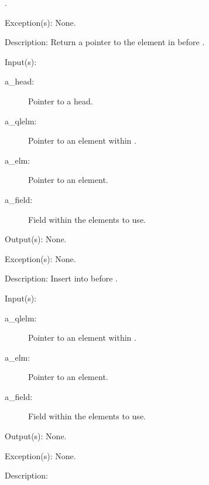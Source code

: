 \begin{capi}
\begin{capilist}
\begin{description}
\begin{description}
				.
			\end{description}
		\end{description}
	\item[Exception(s): ] None.
	\item[Description: ]
		Return a pointer to the element in  before
		.
	\end{capilist}
\label{ql_before_insert}
	\begin{capilist}
	\item[Input(s): ]
		\begin{description}\item[]
		\item[a\_head: ]
			Pointer to a  head.
		\item[a\_qlelm: ]
			Pointer to an element within .
		\item[a\_elm: ]
			Pointer to an element.
		\item[a\_field: ]
			Field within the  elements to use.
		\end{description}
	\item[Output(s): ] None.
	\item[Exception(s): ] None.
	\item[Description: ]
		Insert  into  before .
	\end{capilist}
\label{ql_after_insert}
	\begin{capilist}
	\item[Input(s): ]
		\begin{description}\item[]
		\item[a\_qlelm: ]
			Pointer to an element within \cvar{a\_head}.
		\item[a\_elm: ]
			Pointer to an element.
		\item[a\_field: ]
			Field within the  elements to use.
		\end{description}
	\item[Output(s): ] None.
	\item[Exception(s): ] None.
	\item[Description: ]

\end{capilist}
\end{capi}
